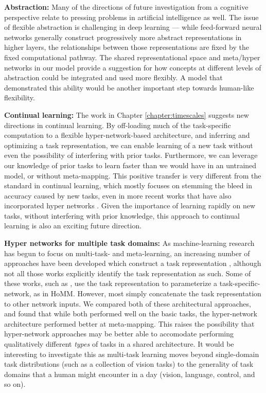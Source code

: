 \textbf{Abstraction:} Many of the directions of future investigation from a cognitive perspective relate to pressing problems in artificial intelligence as well. The issue of flexible abstraction is challenging in deep learning --- while feed-forward neural networks generally construct progressively more abstract representations in higher layers, the relationships between those representations are fixed by the fixed computational pathway. The shared representational space and meta/hyper networks in our model provide a suggestion for how concepts at different levels of abstraction could be integrated and used more flexibly. A model that demonstrated this ability would be another important step towards human-like flexibility. \par 

\textbf{Continual learning:} The work in Chapter \ref{chapter:timescales} suggests new directions in continual learning. By off-loading much of the task-specific computation to a flexible hyper-network-based architecture, and inferring and optimizing a task representation, we can enable learning of a new task without even the possibility of interfering with prior tasks. Furthermore, we can leverage our knowledge of prior tasks to learn faster than we would have in an untrained model, or without meta-mapping. This positive transfer is very different from the standard in continual learning, which mostly focuses on stemming the bleed in accuracy caused by new tasks, even in more recent works that have also incorporated hyper networks \citep{Oswald2020}. Given the importance of learning rapidly on new tasks, without interfering with prior knowledge, this approach to continual learning is also an exciting future direction. \par 

\textbf{Hyper networks for multiple task domains:} As machine-learning research has begun to focus on multi-task- and meta-learning, an increasing number of approaches have been developed which construct a task representation \citep{Hermann2017, Zintgraf2018, Rusu2019}, although not all those works explicitly identify the task representation as such. Some of these works, such as  \citet{Rusu2019}, use the task representation to parameterize a task-specific-network, as in HoMM. However, most simply concatenate the task representation to other network inputs. We compared both of these architectural approaches, and found that while both performed well on the basic tasks, the hyper-network architecture performed better at meta-mapping. This raises the possibility that hyper-network approaches may be better able to accomodate performing qualitatively different \emph{types} of tasks in a shared architecture. It would be interesting to investigate this as multi-task learning moves beyond single-domain task distributions (such as a collection of vision tasks) to the generality of task domains that a human might encounter in a day (vision, language, control, and so on). 

